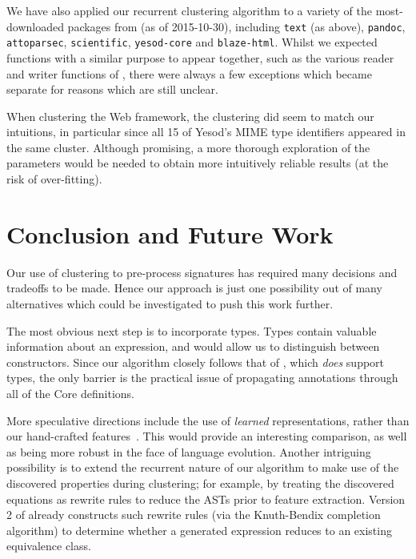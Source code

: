 We have also applied our recurrent clustering algorithm to a variety of the
most-downloaded packages from \hackage{} (as of 2015-10-30), including
\texttt{text} (as above), \texttt{pandoc}, \texttt{attoparsec},
\texttt{scientific}, \texttt{yesod-core} and \texttt{blaze-html}. Whilst we
expected functions with a similar purpose to appear together, such as the
various reader and writer functions of , there were always a few
exceptions which became separate for reasons which are still unclear.

When clustering the  Web framework, the clustering did seem to match
our intuitions, in particular since all 15 of Yesod's MIME type identifiers
appeared in the same cluster. Although promising, a more thorough exploration of
the parameters would be needed to obtain more intuitively reliable results (at
the risk of over-fitting).

\section{Conclusion and Future Work}
\label{sec:conclusion}

Our use of clustering to pre-process \quickspec{} signatures has required many
decisions and tradeoffs to be made. Hence our approach is just one possibility
out of many alternatives which could be investigated to push this work further.

The most obvious next step is to incorporate types. Types contain valuable
information about an expression, and would allow us to distinguish between
constructors. Since our algorithm closely follows that of \mlforpg{}, which
\emph{does} support types, the only barrier is the practical issue of
propagating annotations through all of the Core definitions.

More speculative directions include the use of \emph{learned} representations,
rather than our hand-crafted features~\cite{bengio2013representation}. This
would provide an interesting comparison, as well as being more robust in the
face of language evolution. Another intriguing possibility is to extend the
recurrent nature of our algorithm to make use of the discovered properties
during clustering; for example, by treating the discovered equations as rewrite
rules to reduce the ASTs prior to feature extraction. Version 2 of \quickspec{}
already constructs such rewrite rules (via the Knuth-Bendix completion
algorithm) to determine whether a generated expression reduces to an existing
equivalence class.


